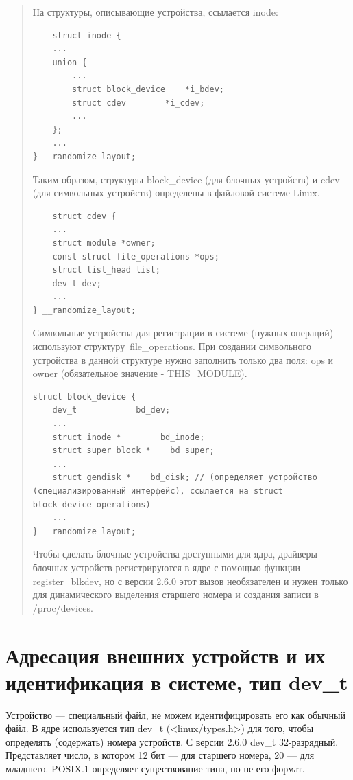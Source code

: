 \begin{quote}

На структуры, описывающие устройства, ссылается inode:

\begin{lstlisting}
	struct inode {
    ...
    union {
        ...
        struct block_device    *i_bdev;
        struct cdev        *i_cdev;
        ...
    };
    ...
} __randomize_layout;
\end{lstlisting}

Таким образом, структуры block\_device (для блочных устройств) и cdev (для символьных устройств) определены в файловой системе Linux.

\begin{lstlisting}
	struct cdev {
    ...
    struct module *owner;
    const struct file_operations *ops;
    struct list_head list;
    dev_t dev;
    ...
} __randomize_layout;
\end{lstlisting}

Символьные устройства для регистрации в системе (нужных операций) используют структуру file\_operations. При создании символьного устройства в данной структуре нужно заполнить только два поля: ops и owner (обязательное значение - THIS\_MODULE).

\begin{lstlisting}
struct block_device {
    dev_t            bd_dev; 
    ...
    struct inode *        bd_inode; 
    struct super_block *    bd_super;
    ...
    struct gendisk *    bd_disk; // (определяет устройство (специализированный интерфейс), ссылается на struct block_device_operations)
    ...
} __randomize_layout;
\end{lstlisting}

Чтобы сделать блочные устройства доступными для ядра, драйверы блочных устройств регистрируются в ядре с помощью функции register\_blkdev, но с версии 2.6.0 этот вызов необязателен и нужен только для динамического выделения старшего номера и создания записи в /proc/devices.

\end{quote}

\section{Адресация внешних устройств и их идентификация в системе, тип dev\_t}

Устройство --- специальный файл, не можем идентифицировать его как обычный файл. В ядре используется тип dev\_t (<linux/types.h>) для того, чтобы определять (содержать) номера устройств. С версии 2.6.0 dev\_t 32-разрядный. Представляет число, в котором 12 бит --- для старшего номера, 20 --- для младшего. POSIX.1 определяет существование типа, но не его формат.

